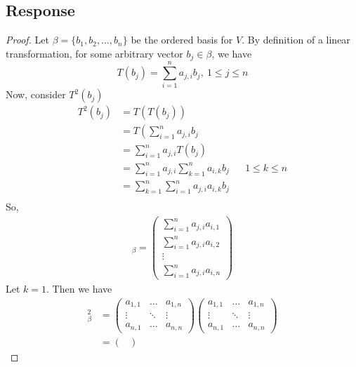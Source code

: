 \documentclass[13pt]{article}
\begin{document}
\subsection*{Response}
\begin{proof}
  Let $\beta = \{ b_1, b_2, \ldots, b_n \}$ be the ordered basis for $V$. By definition of a linear transformation, for some arbitrary vector $b_j \in \beta$, we have
  \[T(b_j) = \sum_{i = 1}^n a_{j, i}b_j, \ 1 \leq j \leq n\]
  Now, consider $T^2(b_j)$
  \begin{align*}
    T^2(b_j) &= T(T(b_j)) \\
             &= T\left( \sum_{i = 1}^n a_{j, i}b_j \\
             &= \sum_{i = 1}^n a_{j, i}T(b_j) \\
             &= \sum_{i = 1}^n a_{j, i} \sum_{k = 1}^n a_{i, k}b_j && 1 \leq k \leq n \\
             &= \sum_{k = 1}^n \sum_{i = 1}^n a_{j, i}a_{i, k}b_j \\
  \end{align*}
  So,
  \begin{align*}
    [T]_\beta =
    \begin{pmatrix}
      \sum_{i = 1}^n a_{j, i}a_{i, 1} \\
      \sum_{i = 1}^n a_{j, i}a_{i, 2} \\
      \vdots \\
      \sum_{i = 1}^n a_{j, i}a_{i, n}    
    \end{pmatrix}
  \end{align*}
  Let $k = 1$. Then we have
  \begin{align*}
    [T]_\beta^2 &=
                  \begin{pmatrix}
                    a_{1,1} & \ldots & a_{1, n} \\
                    \vdots & \ddots & \vdots \\
                    a_{n, 1} & \ldots & a_{n, n}
                  \end{pmatrix}
                  \begin{pmatrix}
                    a_{1,1} & \ldots & a_{1, n} \\
                    \vdots & \ddots & \vdots \\
                    a_{n, 1} & \ldots & a_{n, n}      
                  \end{pmatrix} \\
                &=
                  \begin{pmatrix}

\end{pmatrix}
\end{align*}
\end{proof}
\end{document}
